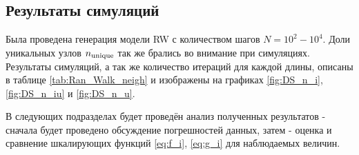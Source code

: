 \subsection{Результаты симуляций}

Была проведена генерация модели RW с количеством шагов $N = 10^{2}-10^{4}$. 
Доли уникальных узлов $n_{\textup{unique}}$ так же брались во внимание при симуляциях. 
Результаты симуляций, а так же количество итераций для каждой длины, описаны в таблице \ref{tab:Ran_Walk_neigh} и изображены на графиках \ref{fig:DS_n_i}, \ref{fig:DS_n_iu} и \ref{fig:DS_n_u}.

В следующих подразделах будет проведён анализ полученных результатов - сначала будет проведено обсуждение погрешностей данных, затем - оценка и сравнение шкалирующих функций \eqref{eq:f_i}, \eqref{eq:g_i} для наблюдаемых величин.

